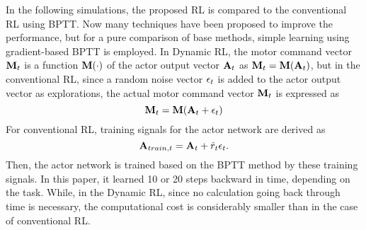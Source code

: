 In the following simulations, the proposed RL is compared to the conventional RL using BPTT.
Now many techniques have been proposed to improve the performance, but for a pure comparison of base methods,
simple learning using gradient-based BPTT is employed.
In Dynamic RL, the motor command vector ${\bf M}_t$
is a function ${\bf M}(\cdot)$ of the actor output vector ${\bf A}_t$ as ${\bf M}_t = {\bf M}({\bf A}_t)$,
but in the conventional RL, since a random noise vector ${\bf \epsilon}_t$ is added to the actor output vector
as explorations, the actual motor command vector ${\bf M}_t$ is expressed as
\begin{equation}
{\bf M}_t = {\bf M}({\bf A}_t + {\bf \epsilon}_t)
\end{equation}
For conventional RL, training signals for the actor network are derived as
\begin{equation}
{\bf A}_{train,t} = {\bf A}_t + \hat{r}_t {\bf \epsilon}_t .
\label{Eq:ConvRL}
\end{equation}
Then, the actor network is trained based on the BPTT method by these training signals.
In this paper, it learned 10 or 20 steps backward in time, depending on the task.
While, in the Dynamic RL, since no calculation going back through time is necessary,
the computational cost is considerably smaller than in the case of conventional RL.

